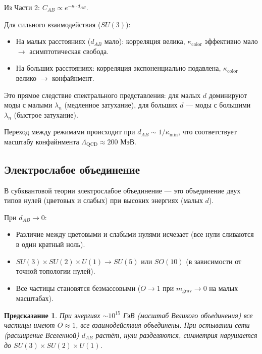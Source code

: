 \documentclass[12pt,a4paper]{article}
\newtheorem{prediction}{Предсказание}[section]
\begin{document}
Из Части 2: $C_{AB} \propto e^{-\kappa \cdot d_{AB}}$.

Для сильного взаимодействия ($SU(3)$):
\begin{itemize}
    \item На малых расстояниях ($d_{AB}$ мало): корреляция велика, $\kappa_{\text{color}}$ эффективно мало $\to$ асимптотическая свобода.
    \item На больших расстояниях: корреляция экспоненциально подавлена, $\kappa_{\text{color}}$ велико $\to$ конфайнмент.
\end{itemize}

Это прямое следствие спектрального представления: для малых $d$ доминируют моды с малыми $\lambda_n$ (медленное затухание), для больших $d$ — моды с большими $\lambda_n$ (быстрое затухание).

Переход между режимами происходит при $d_{AB} \sim 1/\kappa_{\min}$, что соответствует масштабу конфайнмента $\Lambda_{\text{QCD}} \approx 200$ МэВ.

\subsection{Электрослабое объединение}

В субквантовой теории электрослабое объединение — это объединение двух типов нулей (цветовых и слабых) при высоких энергиях (малых $d$).

При $d_{AB} \to 0$:
\begin{itemize}
    \item Различие между цветовыми и слабыми нулями исчезает (все нули сливаются в один кратный ноль).
    \item $SU(3) \times SU(2) \times U(1) \to SU(5)$ или $SO(10)$ (в зависимости от точной топологии нулей).
    \item Все частицы становятся безмассовыми ($O \to 1$ при $m_{\text{grav}} \to 0$ на малых масштабах).
\end{itemize}

\begin{prediction}
При энергиях $\sim 10^{15}$ ГэВ (масштаб Великого объединения) все частицы имеют $O \approx 1$, все взаимодействия объединены. При остывании сети (расширение Вселенной) $d_{AB}$ растёт, нули разделяются, симметрия нарушается до $SU(3) \times SU(2) \times U(1)$.
\end{prediction}
\end{document}
